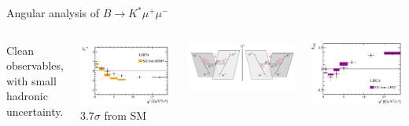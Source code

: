 \documentclass[9pt,usenames,dvipsnames]{beamer}
\begin{document}
\begin{frame}{Angular analysis of $ B \to K^* \mu^+ \mu^-$ }	
	\begin{columns}[c]
		Clean observables, with small hadronic uncertainty.
		\begin{center}
			\includegraphics[width= \textwidth]{./assets/pp_5_lhcb}\\ $3.7 \sigma$ from SM
		\end{center}
		\begin{center}
			\includegraphics[width= \textwidth]{./assets/pp_5.png} \\ 	{\tiny {}}
		\end{center}
		\begin{center}
			\includegraphics[width= \textwidth]{./assets/figs_averages_AFBPad} 

\end{center}
\end{columns}
\end{frame}
\end{document}
